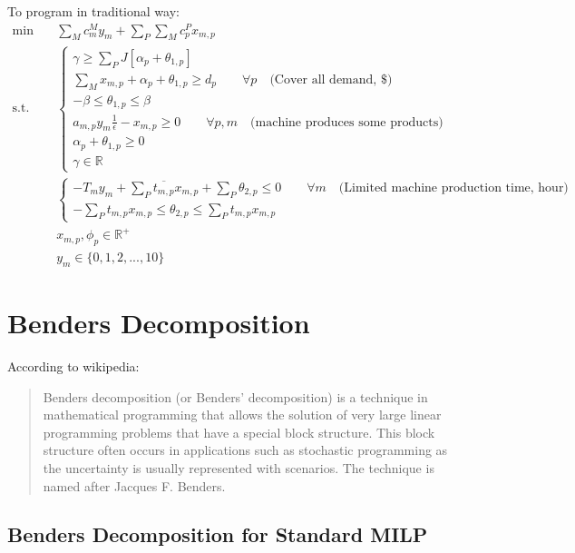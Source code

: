 \documentclass[fleqn,10pt]{wlscirep}
\begin{document}
To program in traditional way:
\begin{align}
    \min \quad & \sum_{M} c^{M}_{m} y_{m} + \sum_{P} \sum_{M} c^{P}_{p} x_{m, p} \\
    \text{s.t.} \quad & \begin{cases}
        \gamma \geq \sum_{P} J \left[\alpha_{p} + \theta_{1, p} \right] \\
        \sum_{M} x_{m, p} + \alpha_{p} + \theta_{1, p} \geq d_{p} \qquad \forall p \quad \text{(Cover all demand, \$)} \\
        - \beta \leq \theta_{1, p} \leq \beta \\
        a_{m, p} y_{m} \frac{1}{\epsilon} - x_{m, p} \geq 0 \qquad \forall p, m \quad \text{(machine produces some products)} \\
        \alpha_{p} + \theta_{1, p} \geq 0 \\
        \gamma \in \mathbb{R}
    \end{cases} \\
    & \begin{cases}
        - T_{m} y_{m} + \sum_{P} \overline{t_{m, p}} x_{m, p} + \sum_{P} \theta_{2, p} \leq 0 \qquad \forall m \quad \text{(Limited machine production time, hour)} \\
        - \sum_{P} t_{m, p} x_{m, p} \leq \theta_{2, p} \leq \sum_{P} t_{m, p} x_{m, p}
    \end{cases} \\
    & x_{m, p}, \phi_{p} \in \mathbb{R}^+ \\
    & y_{m} \in \{0, 1, 2, ..., 10\}
\end{align}




\clearpage
\section{Benders Decomposition}

According to wikipedia:
\begin{quote}
    Benders decomposition (or Benders' decomposition) is a technique in mathematical programming that allows the solution of very large linear programming problems that have a special block structure. This block structure often occurs in applications such as stochastic programming as the uncertainty is usually represented with scenarios. The technique is named after Jacques F. Benders.
\end{quote}

\subsection{Benders Decomposition for Standard MILP}
\end{document}
